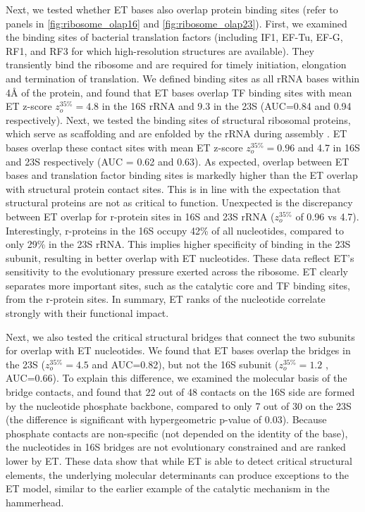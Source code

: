 \documentclass[12pt,a4paper]{report}
\begin{document}
Next, we tested whether ET bases also overlap protein binding sites (refer to panels in \ref{fig:ribosome_olap16} and \ref{fig:ribosome_olap23}). First, we examined the binding sites of bacterial translation factors (including IF1, EF-Tu, EF-G, RF1, and RF3 for which high-resolution structures are available). They transiently bind the ribosome and are required for timely initiation, elongation and termination of translation. We defined binding sites as all rRNA bases within 4Å of the protein, and found that ET bases overlap TF binding sites with mean ET z-score $z_{o}^{35\%}=4.8$  in the 16S rRNA and 9.3 in the 23S (AUC=0.84 and 0.94 respectively). Next, we tested the binding sites of structural ribosomal proteins, which serve as scaffolding and are enfolded by the rRNA during assembly \cite{Nomura1973}. ET bases overlap these contact sites with mean ET z-score $z_{o}^{35\%}=0.96$ and 4.7 in 16S and 23S respectively (AUC = 0.62 and 0.63). As expected, overlap between ET bases and translation factor binding sites is markedly higher than the ET overlap with structural protein contact sites. This is in line with the expectation that structural proteins are not as critical to function. Unexpected is the discrepancy between ET overlap for r-protein sites in 16S and 23S rRNA ($z_{o}^{35\%}$ of 0.96 vs 4.7). Interestingly, r-proteins in the 16S occupy 42\% of all nucleotides, compared to only 29\% in the 23S rRNA. This implies higher specificity of binding in the 23S subunit, resulting in better overlap with ET nucleotides. These data reflect ET’s sensitivity to the evolutionary pressure exerted across the ribosome. ET clearly separates more important sites, such as the catalytic core and TF binding sites, from the r-protein sites. In summary, ET ranks of the nucleotide correlate strongly with their functional impact.

Next, we also tested the critical structural bridges \cite{Liu2016} that connect the two subunits for overlap with ET nucleotides. We found that ET bases overlap the bridges in the 23S ($z_{o}^{35\%}=4.5$  and AUC=0.82), but not the 16S subunit ($z_{o}^{35\%}=1.2$ , AUC=0.66). To explain this difference, we examined the molecular basis of the bridge contacts, and found that 22 out of 48 contacts on the 16S side are formed by the nucleotide phosphate backbone, compared to only 7 out of 30 on the 23S (the difference is significant with hypergeometric p-value of 0.03). Because phosphate contacts are non-specific (not depended on the identity of the base), the nucleotides in 16S bridges are not evolutionary constrained and are ranked lower by ET. These data show that while ET is able to detect critical structural elements, the underlying molecular determinants can produce exceptions to the ET model, similar to the earlier example of the catalytic mechanism in the hammerhead.
\end{document}
